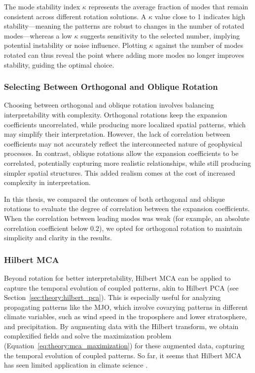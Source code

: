 The mode stability index $\kappa$ represents the average fraction of modes that remain consistent across different rotation solutions. A $\kappa$ value close to 1 indicates high stability---meaning the patterns are robust to changes in the number of rotated modes---whereas a low $\kappa$ suggests sensitivity to the selected number, implying potential instability or noise influence. Plotting $\kappa$ against the number of modes rotated can thus reveal the point where adding more modes no longer improves stability, guiding the optimal choice.

\subsubsection*{Selecting Between Orthogonal and Oblique Rotation} 
Choosing between orthogonal and oblique rotation involves balancing interpretability with complexity. Orthogonal rotations keep the expansion coefficients uncorrelated, while producing more localized spatial patterns, which may simplify their interpretation. However, the lack of correlation between coefficients may not accurately reflect the interconnected nature of geophysical processes. In contrast, oblique rotations allow the expansion coefficients to be correlated, potentially capturing more realistic relationships, while still producing simpler spatial structures. This added realism comes at the cost of increased complexity in interpretation.

In this thesis, we compared the outcomes of both orthogonal and oblique rotations to evaluate the degree of correlation between the expansion coefficients. When the correlation between leading modes was weak (for example, an absolute correlation coefficient below $0.2$), we opted for orthogonal rotation to maintain simplicity and clarity in the results.


\subsubsection*{Hilbert MCA}
Beyond rotation for better interpretability, Hilbert MCA can be applied to capture the temporal evolution of coupled patterns, akin to Hilbert PCA (see Section~\ref{sec:theory:hilbert_pca}). This is especially useful for analyzing propagating patterns like the MJO, which involve covarying patterns in different climate variables, such as wind speed in the troposphere and lower stratosphere, and precipitation. By augmenting data with the Hilbert transform, we obtain complexified fields and solve the maximization problem (Equation~\eqref{eq:theory:mca_maximization}) for these augmented data, capturing the temporal evolution of coupled patterns. So far, it seems that Hilbert MCA has seen limited application in climate science \cite[e.g.][]{elipot_observed_2017}. 


